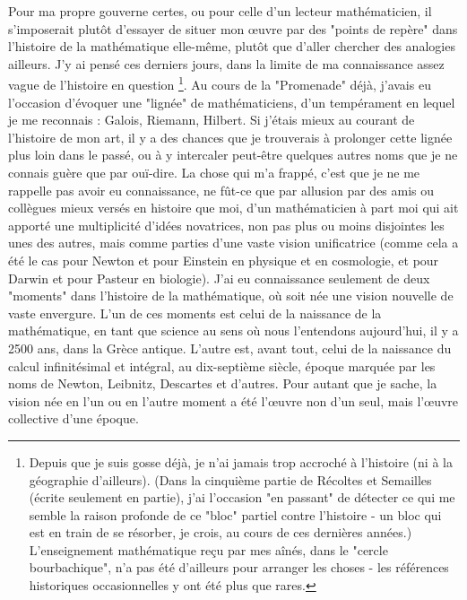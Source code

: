 Pour ma propre gouverne certes, ou pour celle d'un lecteur mathématicien, il s'imposerait plutôt d'essayer de situer mon œuvre par des "points de repère" dans l'histoire de la mathématique elle-même, plutôt que d'aller chercher des analogies ailleurs. J'y ai pensé ces derniers jours, dans la limite de ma connaissance assez vague de l'histoire en question \footnote{Depuis que je suis gosse déjà, je n'ai jamais trop accroché à l'histoire (ni à la géographie d'ailleurs). (Dans la cinquième partie de Récoltes et Semailles (écrite seulement en partie), j'ai l'occasion "en passant" de détecter ce qui me semble la raison profonde de ce "bloc" partiel contre l'histoire - un bloc qui est en train de se résorber, je crois, au cours de ces dernières années.) L'enseignement mathématique reçu par mes aînés, dans le "cercle bourbachique", n'a pas été d'ailleurs pour arranger les choses - les références historiques occasionnelles y ont été plus que rares.}. Au cours de la "Promenade" déjà, j'avais eu l'occasion d'évoquer une "lignée" de mathématiciens, d'un tempérament en lequel je me reconnais : Galois, Riemann, Hilbert. Si j'étais mieux au courant de l'histoire de mon art, il y a des chances que je trouverais à prolonger cette lignée plus loin dans le passé, ou à y intercaler peut-être quelques autres noms que je ne connais guère que par ouï-dire. La chose qui m'a frappé, c'est que je ne me rappelle pas avoir eu connaissance, ne fût-ce que par allusion par des amis ou collègues mieux versés en histoire que moi, d'un mathématicien à part moi qui ait apporté une multiplicité d'idées novatrices, non pas plus ou moins disjointes les unes des autres, mais comme parties d'une vaste vision unificatrice (comme cela a été le cas pour Newton et pour Einstein en physique et en cosmologie, et pour Darwin et pour Pasteur en biologie). J'ai eu connaissance seulement de deux "moments" dans l'histoire de la mathématique, où soit née une vision nouvelle de vaste envergure. L'un de ces moments est celui de la naissance de la mathématique, en tant que science au sens où nous l'entendons aujourd'hui, il y a 2500 ans, dans la Grèce antique. L'autre est, avant tout, celui de la naissance du calcul infinitésimal et intégral, au dix-septième siècle, époque marquée par les noms de Newton, Leibnitz, Descartes et d'autres. Pour autant que je sache, la vision née en l'un ou en l'autre moment a été l'œuvre non d'un seul, mais l'œuvre collective d'une époque.

